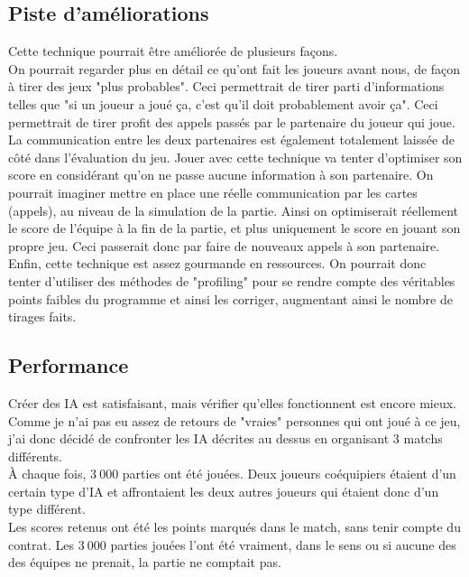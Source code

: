 \documentclass[a4paper,11pt]{article}
\begin{document}

\subsection{Piste d'améliorations}
Cette technique pourrait être améliorée de plusieurs façons. \\

On pourrait regarder plus en détail ce qu'ont fait les joueurs avant nous, de façon à tirer des jeux "plus probables". Ceci permettrait de tirer parti d'informations telles que "si un joueur a joué ça, c'est qu'il doit probablement avoir ça". Ceci permettrait de tirer profit des appels passés par le partenaire du joueur qui joue.\\

La communication entre les deux partenaires est également totalement laissée de côté dans l'évaluation du jeu. Jouer avec cette technique va tenter d'optimiser son score en considérant qu'on ne passe aucune information à son partenaire. On pourrait imaginer mettre en place une réelle communication par les cartes (appels), au niveau de la simulation de la partie. Ainsi on optimiserait réellement le score de l'équipe à la fin de la partie, et plus uniquement le score en jouant son propre jeu. Ceci passerait donc par faire de nouveaux appels à son partenaire. \\

Enfin, cette technique est assez gourmande en ressources. On pourrait donc tenter d'utiliser des méthodes de "profiling" pour se rendre compte des véritables points faibles du programme et ainsi les corriger, augmentant ainsi le nombre de tirages faits. \\

\subsection{Performance}
Créer des IA est satisfaisant, mais vérifier qu'elles fonctionnent est encore mieux. Comme je n'ai pas eu assez de retours de "vraies" personnes qui ont joué à ce jeu, j'ai donc décidé de confronter les IA décrites au dessus en organisant 3 matchs différents. \\
\`A chaque fois, $3~000$ parties ont été jouées. Deux joueurs coéquipiers étaient d'un certain type d'IA et affrontaient les deux autres joueurs qui étaient donc d'un type différent. \\
Les scores retenus ont été les points marqués dans le match, sans tenir compte du contrat. Les $3~000$ parties jouées l'ont été vraiment, dans le sens ou si aucune des des équipes ne prenait, la partie ne comptait pas. \\\\
\end{document}
